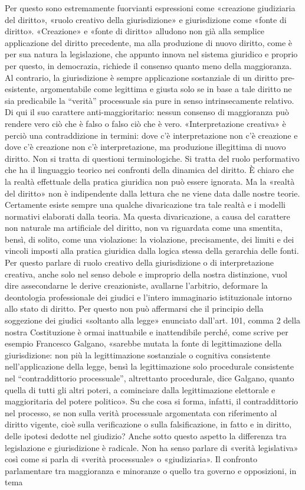 Per questo sono estremamente fuorvianti espressioni come «creazione giudiziaria del diritto», «ruolo creativo della giurisdizione» e giurisdizione come «fonte di diritto». «Creazione» e «fonte di diritto» alludono non già alla semplice applicazione del diritto precedente, ma alla produzione di nuovo diritto, come è per sua natura la legislazione, che appunto innova nel sistema giuridico e proprio per questo, in democrazia, richiede il consenso quanto meno della maggioranza. Al contrario, la giurisdizione è sempre applicazione sostanziale di un diritto pre-esistente, argomentabile come legittima e giusta solo se in base a tale diritto ne sia predicabile la “verità” processuale sia pure in senso intrinsecamente relativo. Di qui il suo carattere anti-maggioritario: nessun consenso di maggioranza può rendere vero ciò che è falso o falso ciò che è vero. «Interpretazione creativa» è perciò una contraddizione in termini: dove c’è interpretazione non c’è creazione e dove c’è creazione non c’è interpretazione, ma produzione illegittima di nuovo diritto. Non si tratta di questioni terminologiche. Si tratta del ruolo performativo che ha il linguaggio teorico nei confronti della dinamica del diritto. È chiaro che la realtà effettuale della pratica giuridica non può essere ignorata. Ma la «realtà del diritto» non è indipendente dalla lettura che ne viene data dalle nostre teorie. Certamente esiste sempre una qualche divaricazione tra tale realtà e i modelli normativi elaborati dalla teoria. Ma questa divaricazione, a causa del carattere non naturale ma artificiale del diritto, non va riguardata come una smentita, bensì, di solito, come una violazione: la violazione, precisamente, dei limiti e dei vincoli imposti alla pratica giuridica dalla logica stessa della gerarchia delle fonti. Per questo parlare di ruolo creativo della giurisdizione o di interpretazione creativa, anche solo nel senso debole e improprio della nostra distinzione, vuol dire assecondarne le derive creazioniste, avallarne l’arbitrio, deformare la deontologia professionale dei giudici e l’intero immaginario istituzionale intorno allo stato di diritto. Per questo non può affermarsi che il principio della soggezione dei giudici «soltanto alla legge» enunciato dall’art. 101, comma 2 della nostra Costituzione è ormai inattuabile e inattendibile perché, come scrive per esempio Francesco Galgano, «sarebbe mutata la fonte di legittimazione della giurisdizione: non più la legittimazione sostanziale o cognitiva consistente nell’applicazione della legge, bensì la legittimazione solo procedurale consistente nel “contraddittorio processuale”, altrettanto procedurale, dice Galgano, quanto quella di tutti gli altri poteri, a cominciare dalla legittimazione elettorale e maggioritaria del potere politico». Su che cosa si forma, infatti, il contraddittorio nel processo, se non sulla verità processuale argomentata con riferimento al diritto vigente, cioè sulla verificazione o sulla falsificazione, in fatto e in diritto, delle ipotesi dedotte nel giudizio? Anche sotto questo aspetto la differenza tra legislazione e giurisdizione è radicale. Non ha senso parlare di «verità legislativa» così come si parla di «verità processuale» o «giudiziaria». Il confronto parlamentare tra maggioranza e minoranze o quello tra governo e opposizioni, in tema 